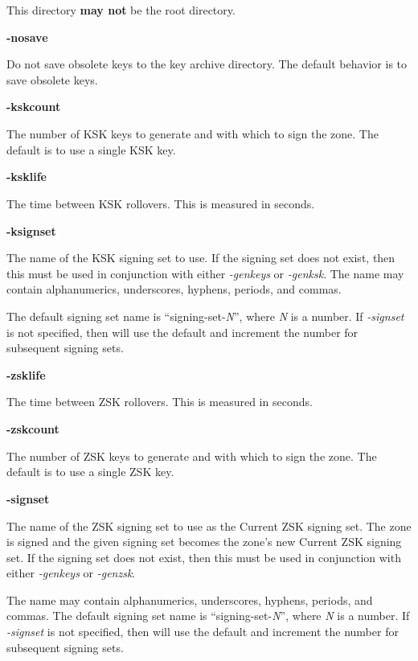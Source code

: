 \begin{description}
This directory {\bf may not} be the root directory.

\item {\bf -nosave}\verb" "

Do not save obsolete keys to the key archive directory.  The default behavior
is to save obsolete keys.

\item {\bf -kskcount}\verb" "

The number of KSK keys to generate and with which to sign the zone.  The
default is to use a single KSK key.

\item {\bf -ksklife}\verb" "

The time between KSK rollovers.  This is measured in seconds.

\item {\bf -ksignset}\verb" "

The name of the KSK signing set to use.  If the signing set does not exist,
then this must be used in conjunction with either {\it -genkeys} or {\it
-genksk}.  The name may contain alphanumerics, underscores, hyphens, periods,
and commas.

The default signing set name is ``signing-set-{\it N}'', where {\it N} is a
number.  If {\it -signset} is not specified, then  will use
the default and increment the number for subsequent signing sets.

\item {\bf -zsklife}\verb" "

The time between ZSK rollovers.  This is measured in seconds.

\item {\bf -zskcount}\verb" "

The number of ZSK keys to generate and with which to sign the zone.  The
default is to use a single ZSK key.

\item {\bf -signset}\verb" "

The name of the ZSK signing set to use as the Current ZSK signing set.  The
zone is signed and the given signing set becomes the zone's new Current ZSK
signing set.  If the signing set does not exist, then this must be used in
conjunction with either {\it -genkeys} or {\it -genzsk}.

The name may contain alphanumerics, underscores, hyphens, periods, and commas.
The default signing set name is ``signing-set-{\it N}'', where {\it N} is a
number.  If {\it -signset} is not specified, then  will use
the default and increment the number for subsequent signing sets.


\end{description}
